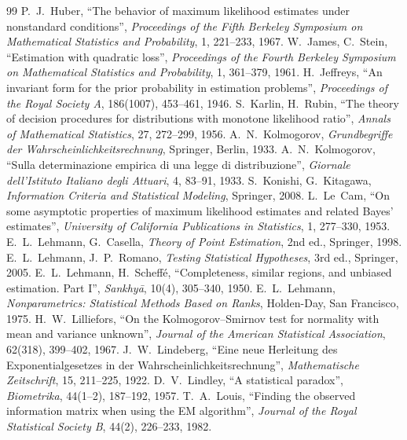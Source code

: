 \documentclass[main.tex]{subfiles}
\begin{document}
\begin{thebibliography}{99}
 P.~J.~Huber, ``The behavior of maximum likelihood estimates under nonstandard conditions'', \emph{Proceedings of the Fifth Berkeley Symposium on Mathematical Statistics and Probability}, 1, 221--233, 1967.
 W.~James, C.~Stein, ``Estimation with quadratic loss'', \emph{Proceedings of the Fourth Berkeley Symposium on Mathematical Statistics and Probability}, 1, 361--379, 1961.
 H.~Jeffreys, ``An invariant form for the prior probability in estimation problems'', \emph{Proceedings of the Royal Society A}, 186(1007), 453--461, 1946.
 S.~Karlin, H.~Rubin, ``The theory of decision procedures for distributions with monotone likelihood ratio'', \emph{Annals of Mathematical Statistics}, 27, 272--299, 1956.
 A.~N.~Kolmogorov, \emph{Grundbegriffe der Wahrscheinlichkeitsrechnung}, Springer, Berlin, 1933.
 A.~N.~Kolmogorov, ``Sulla determinazione empirica di una legge di distribuzione'', \emph{Giornale dell'Istituto Italiano degli Attuari}, 4, 83--91, 1933.
 S.~Konishi, G.~Kitagawa, \emph{Information Criteria and Statistical Modeling}, Springer, 2008.
 L.~Le~Cam, ``On some asymptotic properties of maximum likelihood estimates and related Bayes' estimates'', \emph{University of California Publications in Statistics}, 1, 277--330, 1953.
 E.~L.~Lehmann, G.~Casella, \emph{Theory of Point Estimation}, 2nd ed., Springer, 1998.
 E.~L.~Lehmann, J.~P.~Romano, \emph{Testing Statistical Hypotheses}, 3rd ed., Springer, 2005.
 E.~L.~Lehmann, H.~Scheffé, ``Completeness, similar regions, and unbiased estimation. Part I'', \emph{Sankhy\=a}, 10(4), 305--340, 1950.
 E.~L.~Lehmann, \emph{Nonparametrics: Statistical Methods Based on Ranks}, Holden-Day, San Francisco, 1975.
 H.~W.~Lilliefors, ``On the Kolmogorov--Smirnov test for normality with mean and variance unknown'', \emph{Journal of the American Statistical Association}, 62(318), 399--402, 1967.
 J.~W.~Lindeberg, ``Eine neue Herleitung des Exponentialgesetzes in der Wahrscheinlichkeitsrechnung'', \emph{Mathematische Zeitschrift}, 15, 211--225, 1922.
 D.~V.~Lindley, ``A statistical paradox'', \emph{Biometrika}, 44(1--2), 187--192, 1957.
 T.~A.~Louis, ``Finding the observed information matrix when using the EM algorithm'', \emph{Journal of the Royal Statistical Society B}, 44(2), 226--233, 1982.

\end{thebibliography}
\end{document}
